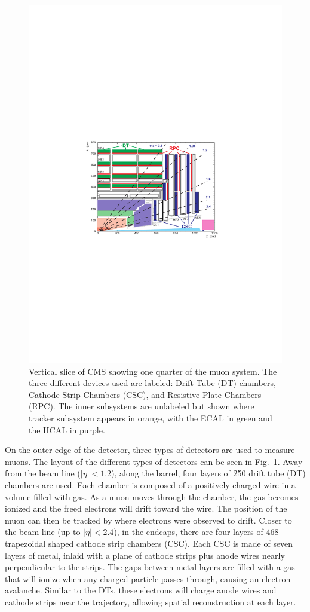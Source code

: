 \begin{figure}[htbp]
\begin{center}
\includegraphics[width=.7\linewidth]{Experiment/figures/MuonSystem.pdf}
\caption[Arrangement of Detectors in CMS Muon System]{Vertical slice of CMS showing one quarter of the muon system. The three different devices used are labeled: Drift Tube (DT) chambers, Cathode Strip Chambers (CSC), and Resistive Plate Chambers (RPC). The inner subsystems are unlabeled but shown where tracker subsystem appears in orange, with the ECAL in green and the HCAL in purple.}
\label{fig:MuonSystem}
\end{center}
\end{figure}

On the outer edge of the detector, three types of detectors are used to measure muons. The layout of the different types of detectors can be seen in Fig.~\ref{fig:MuonSystem}. Away from the beam line ($|\eta|<1.2$), along the barrel, four layers of 250 drift tube (DT) chambers are used. Each chamber is composed of a positively charged wire in a volume filled with gas. As a muon moves through the chamber, the gas becomes ionized and the freed electrons will drift toward the wire. The position of the muon can then be tracked by where electrons were observed to drift. Closer to the beam line (up to $|\eta|<2.4$), in the endcaps, there are four layers of 468 trapezoidal shaped cathode strip chambers (CSC). Each CSC is made of seven layers of metal, inlaid with a plane of cathode strips plus anode wires nearly perpendicular to the strips. The gaps between metal layers are filled with a gas that will ionize when any charged particle passes through, causing an electron avalanche. Similar to the DTs, these electrons will charge anode wires and cathode strips near the trajectory, allowing spatial reconstruction at each layer.

